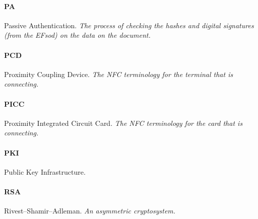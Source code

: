 \paragraph{PA} Passive Authentication. \textit{The process of checking the hashes and digital signatures (from the EFsod) on the data on the document.}
\paragraph{PCD} Proximity Coupling Device. \textit{The NFC terminology for the terminal that is connecting.}
\paragraph{PICC} Proximity Integrated Circuit Card. \textit{The NFC terminology for the card that is connecting.}
\paragraph{PKI} Public Key Infrastructure. \textit{}
\paragraph{RSA} Rivest–Shamir–Adleman. \textit{An asymmetric cryptosystem.}
